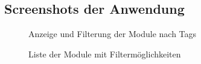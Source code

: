 \subsection{Screenshots der Anwendung}
\label{Screenshots}
\begin{figure}[htb]
\centering
{}
\caption{Anzeige und Filterung der Module nach Tags}
\end{figure}
\clearpage
\begin{figure}[htb]
\centering
{}
\caption{Liste der Module mit Filtermöglichkeiten}
\end{figure}
\clearpage
